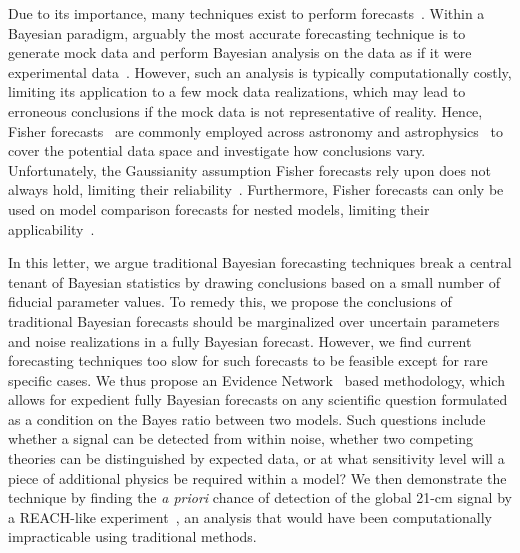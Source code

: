\documentclass[twocolumn,english,aps,prl,amsmath,amssymb,reprint,footinbib,floatfix,showkeys]{revtex4-2}
\begin{document}
Due to its importance, many techniques exist to perform forecasts~\citep[e.g.][]{Fisher_1922, Trotta_2007b, Sellentin_2014, Ryan_2023}. 
Within a Bayesian paradigm, arguably the most accurate forecasting technique is to generate mock data and perform Bayesian analysis on the data as if it were experimental data~\citep[e.g.][]{Anstey_2021, Rieck_2023}.
However, such an analysis is typically computationally costly, limiting its application to a few mock data realizations, which may lead to erroneous conclusions if the mock data is not representative of reality.
Hence, Fisher forecasts~\citep{Fisher_1922} are commonly employed across astronomy and astrophysics~\citep{Tegmark_1997, DETF, Trotta_2007b, 2007_Seo, Vallisneri_2008, More_2013, DiDio_2014, Zhai_2017, Bonvin_2018, Simons, Euclid_2020, dAssignies_2023, Mason_2023} to cover the potential data space and investigate how conclusions vary.
Unfortunately, the Gaussianity assumption Fisher forecasts rely upon does not always hold, limiting their reliability~\citep[e.g.][]{Perotto_2006, Wolz_2012}.
Furthermore, Fisher forecasts can only be used on model comparison forecasts for nested models, limiting their applicability~\citep{Trotta_2007}. 


In this letter, we argue traditional Bayesian forecasting techniques break a central tenant of Bayesian statistics by drawing conclusions based on a small number of fiducial parameter values. 
To remedy this, we propose the conclusions of traditional Bayesian forecasts should be marginalized over uncertain parameters and noise realizations in a fully Bayesian forecast. 
However, we find current forecasting techniques too slow for such forecasts to be feasible except for rare specific cases.
We thus propose an Evidence Network~\citep{EN} based methodology, which allows for expedient fully Bayesian forecasts on any scientific question formulated as a condition on the Bayes ratio between two models.
Such questions include whether a signal can be detected from within noise, whether two competing theories can be distinguished by expected data, or at what sensitivity level will a piece of additional physics be required within a model?
We then demonstrate the technique by finding the \textit{a priori} chance of detection of the global 21-cm signal by a REACH-like experiment~\citep{REACH}, an analysis that would have been computationally impracticable using traditional methods.
\end{document}
